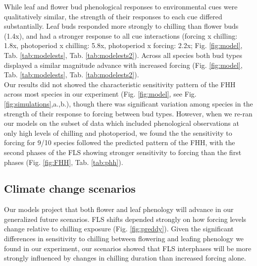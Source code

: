 \documentclass[11pt]{article}\usepackage[]{graphicx}\usepackage[]{color}
\begin{document}
\noindent While leaf and flower bud phenological responses to environmental cues were qualitatively similar, the strength of their responses to each cue differed substantially. Leaf buds responded more strongly to chilling than flower buds (1.4x), and had a stronger response to all cue interactions (forcing x chilling: 1.8x, photoperiod x chilling: 5.8x, photoperiod x forcing: 2.2x; Fig. \ref{fig:model}, Tab. \ref{tab:modelests}, Tab. \ref{tab:modelests2}). Across all species both bud types displayed a similar magnitude advance with increased forcing (Fig. \ref{fig:model}, Tab. \ref{tab:modelests}, Tab. \ref{tab:modelests2}).\\

\noindent  Our results did not showed the characteristic sensitivity pattern of the FHH across most species in our experiment (Fig. \ref{fig:model}, see Fig. \ref{fig:simulations},a.,b.), though there was significant variation among species in the strength of their response to forcing between bud types. However, when we re-ran our models on the subset of data which included phenological observations at only high levels of chilling and photoperiod, we found the the sensitivity to forcing for 9/10 species followed the predicted pattern of the FHH, with the second phases of the FLS showing stronger sensitivity to forcing than the first phases (Fig. \ref{fig:FHH}, Tab. \ref{tab:phh}).\\ 

\subsection*{Climate change scenarios}
\noindent Our models project that both flower and leaf phenology will advance in our generalized future scenarios. FLS shifts depended strongly on how forcing levels change relative to chilling exposure (Fig. \ref{fig:preddy}). Given the significant differences in sensitivity to chilling between flowering and leafing phenology we found in our experiment, our scenarios showed that FLS interphases will be more strongly influenced by changes in chilling duration than increased forcing alone.\\ 
\end{document}
